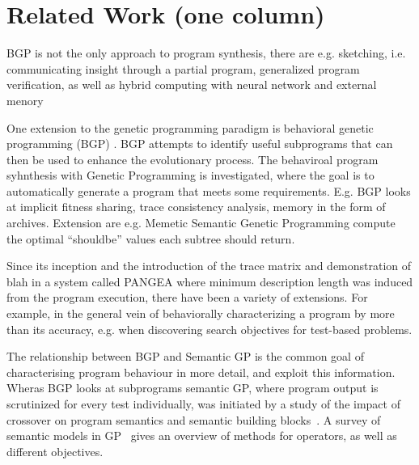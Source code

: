 \section{Related Work (one column)}
\label{sec:related-work}

BGP is not the only approach to program synthesis, there are e.g. sketching\cite{solar2008program}, i.e. communicating insight through a partial program, generalized program verification\cite{srivastava2010program}, as well as hybrid computing with neural network and external menory\cite{graves2016hybrid}

One extension to the genetic programming paradigm is behavioral
genetic programming (BGP) \cite{krawiecGECCO2014,KrawiecBPS2016}.  BGP attempts to identify
useful subprograms that can then be used to enhance the evolutionary
process. The behaviroal program syhnthesis with Genetic
Programming\cite{krawiec2016behavioral} is investigated, where the
goal is to automatically generate a program that meets some
requirements. E.g. BGP looks at implicit fitness
sharing\cite{mckay2000fitness}, trace consistency analysis, memory in
the form of archives\cite{haynes1997line}. Extension are e.g. Memetic Semantic Genetic
Programming\cite{Ffrancon:2015:MSG:2739480.2754697} compute the
optimal ``shouldbe'' values each subtree should return.

Since its inception\cite{KrawiecSwan} and the introduction of the
trace matrix and demonstration of blah in a system called
PANGEA\cite{krawiec2013pattern} where minimum description length was
induced from the program execution, there have been a variety of
extensions. For example, in the general vein of behaviorally
characterizing a program by more than its accuracy, e.g. when
discovering search objectives for test-based
problems\cite{liskowski2016online}.

The relationship between BGP and Semantic GP is the common goal of
characterising program behaviour in more detail, and exploit this
information. Wheras BGP looks at subprograms semantic GP, where
program output is scrutinized for every test individually, was
initiated by a study of the impact of crossover on program semantics
and semantic building blocks~\cite{mcphee2008semantic}. A survey of
semantic models in GP~\cite{vanneschi2014survey} gives an overview of
methods for operators, as well as different objectives.

